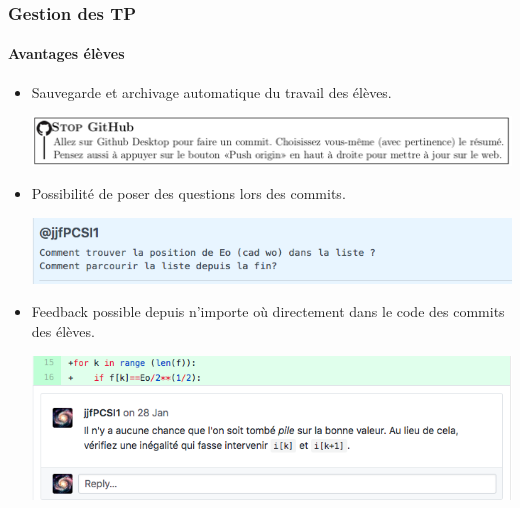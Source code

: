 \begin{frame}
	\frametitle{Gestion des TP}
	\framesubtitle{Avantages élèves}

	\begin{itemize}[<+->]
		\item Sauvegarde et archivage automatique du travail des élèves.

		 {
		\begin{center}
				\includegraphics[width=\linewidth]{figures/stop_github.png}
		\end{center}
		}

		\item Possibilité de poser des questions lors des commits.

		\visible<2-> {
		\begin{center}
				\includegraphics[width=0.8\linewidth]{figures/github_questions_commit.png}
		\end{center}
		}

		\item Feedback possible depuis n'importe où directement dans le code des commits des élèves.

		\visible<3-> {
			\begin{center}
					\includegraphics[width=0.8\linewidth]{figures/github_commentaires_commit.png}
			\end{center}
		}

	\end{itemize}

\end{frame}

